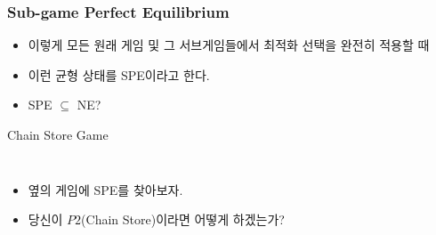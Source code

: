 \documentclass[final]{beamer}
\begin{document}
\begin{frame}\frametitle{Sub-game Perfect Equilibrium}\vspace{3em}
\begin{itemize}
	\item 이렇게 모든 원래 게임 및 그 서브게임들에서 최적화 선택을 완전히 적용할 때 
	\item 이런 균형 상태를 SPE이라고 한다. 
	\item SPE $\subseteq$ NE?
\end{itemize}
\end{frame}

\begin{frame}[t]{Chain Store Game}
	\begin{columns}[c]
	\begin{itemize}
		\item 옆의 게임에 SPE를 찾아보자.
		\item 당신이 $P2$(Chain Store)이라면 어떻게 하겠는가?
	\end{itemize}
	\end{columns}
\end{frame}
\end{document}
